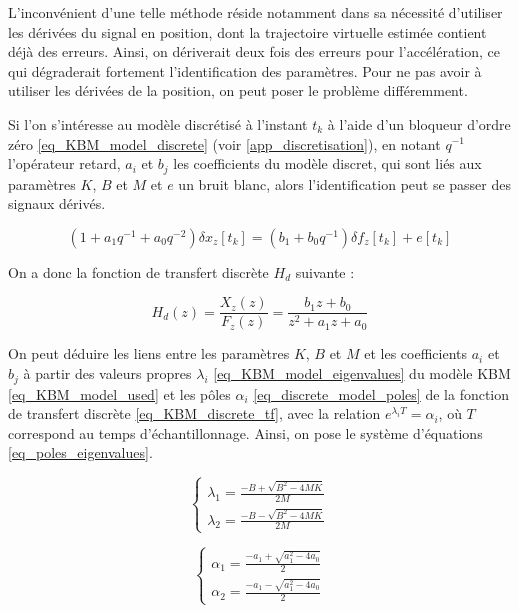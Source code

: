 L'inconvénient d'une telle méthode réside notamment dans sa nécessité d'utiliser les dérivées du signal en position, dont la trajectoire virtuelle estimée contient déjà des erreurs. Ainsi, on dériverait deux fois des erreurs pour l'accélération, ce qui dégraderait fortement l'identification des paramètres. Pour ne pas avoir à utiliser les dérivées de la position, on peut poser le problème différemment.

Si l'on s'intéresse au modèle discrétisé à l'instant $t_k$ à l'aide d'un bloqueur d'ordre zéro \cref{eq_KBM_model_discrete} (voir \cref{app_discretisation}), en notant $q^{-1}$ l'opérateur retard, $a_i$ et $b_j$ les coefficients du modèle discret, qui sont liés aux paramètres $K$, $B$ et $M$ et $e$ un bruit blanc, alors l'identification peut se passer des signaux dérivés. 

\begin{equation}\label{eq_KBM_model_discrete}
	(1 + a_1q^{-1} + a_0q^{-2})\delta x_z[t_k] = (b_1 + b_0q^{-1})\delta f_z[t_k] + e[t_k]
\end{equation}

On a donc la fonction de transfert discrète $H_d$ suivante :

\begin{equation}\label{eq_KBM_discrete_tf}
	H_d(z) = \frac{X_z(z)}{F_z(z)} = \frac{b_1 z + b_0}{z^2 + a_1 z + a_0}
\end{equation}

On peut déduire les liens entre les paramètres $K$, $B$ et $M$ et les coefficients $a_i$ et $b_j$ à partir des valeurs propres $\lambda_i$ \cref{eq_KBM_model_eigenvalues} du modèle KBM \cref{eq_KBM_model_used} et les pôles $\alpha_i$ \cref{eq_discrete_model_poles} de la fonction de transfert discrète \cref{eq_KBM_discrete_tf}, avec la relation $e^{\lambda_iT} = \alpha_i$, où $T$ correspond au temps d'échantillonnage. Ainsi, on pose le système d'équations \cref{eq_poles_eigenvalues}.

\begin{equation} \label{eq_KBM_model_eigenvalues}
	\begin{cases}
		\lambda_1 = \frac{-B + \sqrt{B^2-4MK}}{2M}\\
		\lambda_2 = \frac{-B - \sqrt{B^2-4MK}}{2M}
	\end{cases}
\end{equation}

\begin{equation} \label{eq_discrete_model_poles}
	\begin{cases}
		\alpha_1 = \frac{-a_1 + \sqrt{a_1^2-4a_0}}{2}\\
		\alpha_2 = \frac{-a_1 - \sqrt{a_1^2-4a_0}}{2}
	\end{cases}
\end{equation}

